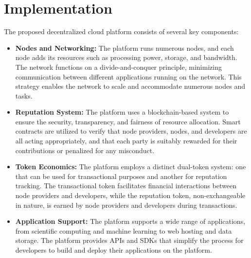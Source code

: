 \section{Implementation}
\label{sec:implementation}


The proposed decentralized cloud platform consists of several key components:

\begin{itemize}
    \item \textbf{Nodes and Networking:} The platform runs numerous nodes, and each node adds its resources such as processing power, storage, and bandwidth. The network functions on a divide-and-conquer principle, minimizing communication between different applications running on the network. This strategy enables the network to scale and accommodate numerous nodes and tasks.

    \item \textbf{Reputation System:} The platform uses a blockchain-based system to ensure the security, transparency, and fairness of resource allocation. Smart contracts are utilized to verify that node providers, nodes, and developers are all acting appropriately, and that each party is suitably rewarded for their contributions or penalized for any misconduct.

    \item \textbf{Token Economics:} The platform employs a distinct dual-token system: one that can be used for transactional purposes and another for reputation tracking. The transactional token facilitates financial interactions between node providers and developers, while the reputation token, non-exchangeable in nature, is earned by node providers and developers during transactions.

    \item \textbf{Application Support:} The platform supports a wide range of applications, from scientific computing and machine learning to web hosting and data storage. The platform provides APIs and SDKs that simplify the process for developers to build and deploy their applications on the platform.
\end{itemize}


